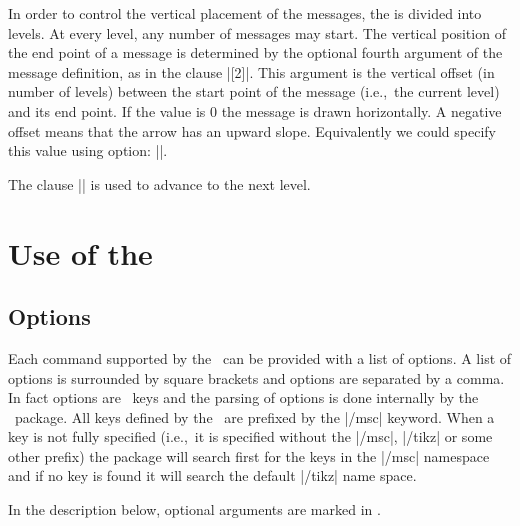 \documentclass[12pt,a4paper]{article}
\begin{document}
In order to control the vertical placement of the messages, the \MSC{} is
divided into levels. At every level, any number of messages may start.
The vertical position of the end point of a message is determined
by the optional fourth argument of the message definition, as in the
clause |[2]|.
This argument is the vertical offset (in number of levels) between the
start point of the message (i.e.,\ the current level) and its end point.
If the value is 0 the message is drawn horizontally. A negative offset
means that the arrow has an upward slope. Equivalently we could specify this
value using option:  ||.

The clause |\nextlevel| is used to advance to the next level.

\section{Use of the \mscpack}
\label{use}
\subsection{Options}
Each command supported by the \mscpack\ can be provided with a list of
options. A list of
options is surrounded by square brackets and options are separated
by a comma. In fact options are \pgfname\ keys and the parsing of options
is done internally by the \tikzname\ package. All keys defined by the
\mscpack\ are
prefixed by the |/msc| keyword. When a key is not fully specified (i.e.,\ it is
specified without the |/msc|, |/tikz| or some other prefix) the
package will search first for the keys in the |/msc| namespace and if no
key is found it will search the default |/tikz| name space.

In the description below, optional arguments are marked in .
\end{document}
